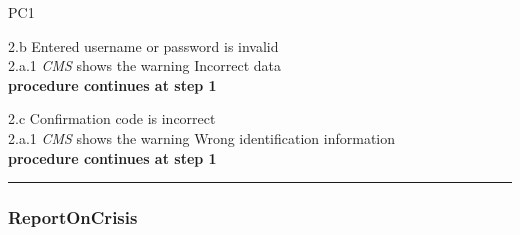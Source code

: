 \begin{lyxlist}{PC1}
{2.b Entered username or password is invalid\\
\hspace*{0.5cm} 2.a.1 \emph{CMS} shows the warning Incorrect data\\
\hspace*{0.5cm} \textbf{procedure continues at step 1}

2.c Confirmation code is incorrect\\
\hspace*{0.5cm} 2.a.1 \emph{CMS} shows the warning Wrong identification information\\
\hspace*{0.5cm} \textbf{procedure continues at step 1}

}
\end{lyxlist}
\hrule
\vspace{0.5cm}

\subsubsection{ReportOnCrisis}

